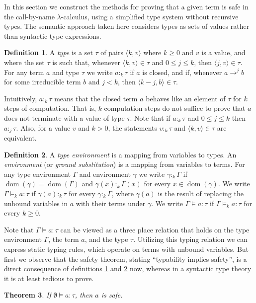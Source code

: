 \documentclass[10pt,a4paper,final,twocolumn]{article}
\theoremstyle{definition}
\newtheorem{definition}{Definition}
\theoremstyle{plain}
\newtheorem{theorem}[definition]{Theorem}
\newcommand{\pair}[1]{\ensuremath{\langle{#1}\rangle}}
\DeclareMathOperator{\dom}{dom}
\begin{document}
In this section we construct the methods for proving that a given term is safe in the call-by-name
$\lambda$-calculus, using a simplified type system without recursive types. The semantic approach
taken here considers types as sets of values rather than syntactic type expressions.
\begin{definition} \label{def:Type}
  A \emph{type} is a set $\tau$ of pairs $\pair{k,v}$ where $k \ge 0$ and $v$ is a value, and where the
  set $\tau$ is such that, whenever $\pair{k,v} \in \tau$ and $0 \le j \le k$, then $\pair{j,v} \in \tau$.
  For any term $a$ and type $\tau$ we write $a :_k \tau$ if $a$ is closed, and if, whenever $a \to^j b$ for some
  irreducible term $b$ and $j < k$, then $\pair{k-j,b} \in \tau$.
\end{definition}
Intuitively, $a :_k \tau$ means that the closed term $a$ behaves like an element of $\tau$ for $k$ steps
of computation. That is, $k$ computation steps do not suffice to prove that $a$ does not terminate with
a value of type $\tau$. Note that if $a :_k \tau$ and $0 \le j \le k$ then $a :_j \tau$. Also, for a value
$v$ and $k > 0$, the statements $v :_k \tau$ and $\pair{k,v} \in \tau$ are equivalent.
\begin{definition} \label{def:Typing}
  A \emph{type environment} is a mapping from variables to types. An \emph{environment}
  (or \emph{ground substitution}) is a mapping from variables to terms. For any type environment
  $\Gamma$ and environment $\gamma$ we write $\gamma :_k \Gamma$ if $\dom(\gamma) = \dom(\Gamma)$ and
  $\gamma(x) :_k \Gamma(x)$ for every $x \in \dom(\gamma)$. We write $\Gamma \models_k a : \tau$ if
  $\gamma(a) :_k \tau$ for every $\gamma :_k \Gamma$,
  where $\gamma(a)$ is the result of replacing the unbound variables in $a$ with their terms under
  $\gamma$. We write $\Gamma \models a : \tau$ if $\Gamma \models_k a : \tau$ for every $k \ge 0$.
\end{definition}
Note that $\Gamma \models a : \tau$ can be viewed as a three place relation that holds on the
type environment $\Gamma$, the term $a$, and the type $\tau$. Utilizing this typing relation
we can express static typing rules, which operate on terms with unbound variables. But first
we observe that the safety theorem, stating ``typability implies safety'', is a direct consequence
of definitions \ref{def:Type} and \ref{def:Typing} now, whereas in a syntactic type theory
it is at least tedious to prove.
\begin{theorem}
  If $\emptyset \models a : \tau$, then $a$ is safe.
\end{theorem}
\end{document}
